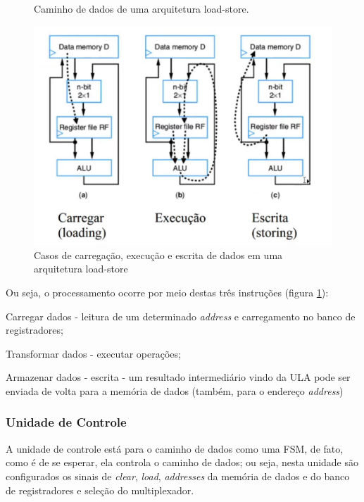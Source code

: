\documentclass{article}
\begin{document}
\begin{figure}[h]
\centering
\begin{minipage}{0.48\textwidth}
     \centering
     \def\svgwidth{0.7\textwidth}
     
     \caption{\label{fig:loadstore} Caminho de dados de uma arquitetura load-store. }
     \hfill
\end{minipage}\hfill
\begin{minipage}{0.48\textwidth}
    \centering 
    \includegraphics[width=1\textwidth]{loadstore2.jpg} 
    \caption{Casos de carregação, execução e escrita de dados em uma arquitetura load-store} 
    \label{fig:casosloadstore} 
\end{minipage}
\end{figure}


Ou seja, o processamento ocorre por meio destas três instruções (figura \ref{fig:casosloadstore}):

\begin{boxlabel}
     \item Carregar dados - leitura de um determinado \textit{address} e carregamento no banco de registradores;
     \item Transformar dados - executar operações;
     \item Armazenar dados - escrita - um resultado intermediário vindo da ULA pode ser enviada de volta para a memória de dados (também, para o endereço  \textit{address})
\end{boxlabel}

\newpage
\subsubsection{Unidade de Controle}
A unidade de controle está para o caminho de dados como uma FSM, de fato, como é de se esperar, ela controla o caminho de dados; ou seja, nesta unidade são configurados os sinais de \textit{clear}, \textit{load}, \textit{addresses} da memória de dados e do banco de registradores e seleção do multiplexador.
\end{document}
